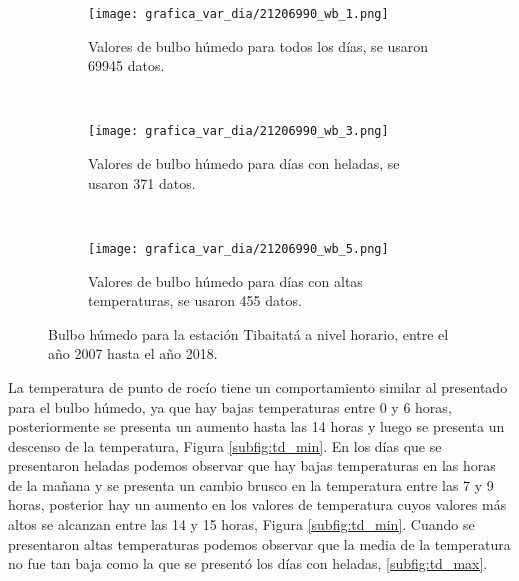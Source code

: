 \begin{figure}[H]
    \centering
    \begin{subfigure}[b]{0.45\textwidth}
    \caption{Valores de bulbo húmedo para todos los días, se usaron 69945 datos.}
	\texttt{[image: grafica\_var\_dia/21206990\_wb\_1.png]}
    \label{subfig:wb_total}
	\end{subfigure}
	~
    \begin{subfigure}[b]{0.45\textwidth}
    \caption{Valores de bulbo húmedo para días con heladas, se usaron 371 datos.}
	\texttt{[image: grafica\_var\_dia/21206990\_wb\_3.png]}
    \label{subfig:wb_min}
	\end{subfigure}
		~
    \begin{subfigure}[b]{0.45\textwidth}
    \caption{Valores de bulbo húmedo para días con altas temperaturas, se usaron 455 datos.}
	\texttt{[image: grafica\_var\_dia/21206990\_wb\_5.png]}
    \label{subfig:wb_max}
	\end{subfigure}
	
    \caption{Bulbo húmedo para la estación Tibaitatá a nivel horario, entre el año 2007 hasta el año 2018.}
\end{figure}


La temperatura de punto de rocío tiene un comportamiento similar al presentado para el bulbo húmedo, ya que hay bajas temperaturas entre 0 y 6 horas, posteriormente se presenta un aumento hasta las 14 horas y luego se presenta un descenso de la temperatura, Figura \ref{subfig:td_min}. En los días que se presentaron heladas podemos observar que hay bajas temperaturas en las horas de la mañana y se presenta un cambio brusco en la temperatura entre las 7 y 9 horas, posterior hay un aumento en los valores de temperatura cuyos valores más altos se alcanzan entre las 14 y 15 horas, Figura \ref{subfig:td_min}. Cuando se presentaron altas temperaturas podemos observar que la media de la temperatura no fue tan baja como la que se presentó los días con heladas, \ref{subfig:td_max}.


